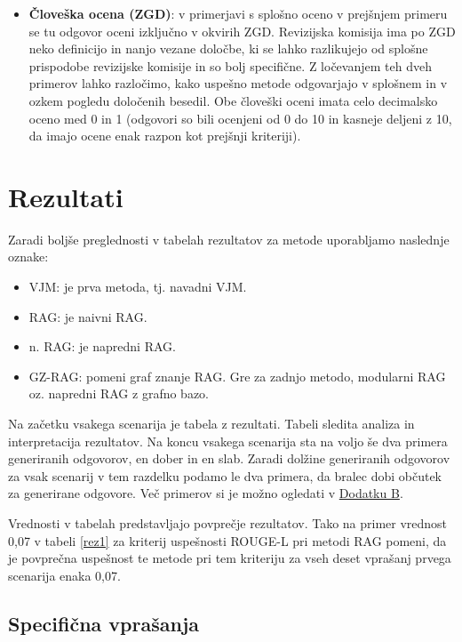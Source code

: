 \documentclass[a4paper,12pt,openright]{book}
\begin{document}
\begin{itemize}
	\item \textbf{Človeška ocena (ZGD)}: v primerjavi s splošno oceno v prejšnjem primeru se tu odgovor oceni izključno v okvirih ZGD. Revizijska komisija ima po ZGD neko definicijo in nanjo vezane določbe, ki se lahko razlikujejo od splošne prispodobe revizijske komisije in so bolj specifične. Z ločevanjem teh dveh primerov lahko razločimo, kako uspešno metode odgovarjajo v splošnem in v ozkem pogledu določenih besedil. Obe človeški oceni imata celo decimalsko oceno med 0 in 1 (odgovori so bili ocenjeni od 0 do 10 in kasneje deljeni z 10, da imajo ocene enak razpon kot prejšnji kriteriji).
\end{itemize}

\section{Rezultati}

Zaradi boljše preglednosti v tabelah rezultatov za metode uporabljamo naslednje oznake:

\begin{itemize}
	\item VJM: je prva metoda, tj. navadni VJM.
	\item RAG: je naivni RAG.
	\item n. RAG: je napredni RAG.
	\item GZ-RAG: pomeni graf znanje RAG. Gre za zadnjo metodo, modularni RAG oz. napredni RAG z grafno bazo.
\end{itemize}

Na začetku vsakega scenarija je tabela z rezultati. Tabeli sledita analiza in interpretacija rezultatov. Na koncu vsakega scenarija sta na voljo še dva primera generiranih odgovorov, en dober in en slab. Zaradi dolžine generiranih odgovorov za vsak scenarij v tem razdelku podamo le dva primera, da bralec dobi občutek za generirane odgovore. Več primerov si je možno ogledati v \hyperref[appendix_b]{Dodatku B}.

Vrednosti v tabelah predstavljajo povprečje rezultatov. Tako na primer vrednost 0,07 v tabeli \ref{rez1} za kriterij uspešnosti ROUGE-L pri metodi RAG pomeni, da je povprečna uspešnost te metode pri tem kriteriju za vseh deset vprašanj prvega scenarija enaka 0,07.

\subsection{Specifična vprašanja}
\end{document}
